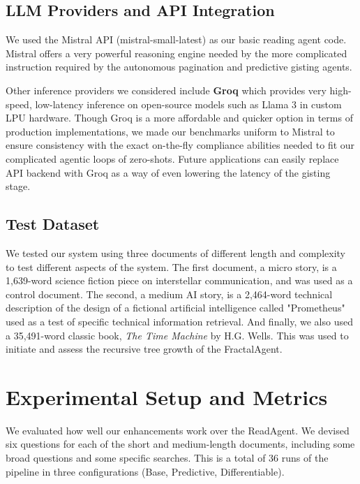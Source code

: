 \documentclass[conference]{IEEEtran}
\begin{document}
\subsection{LLM Providers and API Integration}
We used the Mistral API (mistral-small-latest) as our basic reading agent code. Mistral offers a very powerful reasoning engine needed by the more complicated instruction required by the autonomous pagination and predictive gisting agents. 

Other inference providers we considered include \textbf{Groq} which provides very high-speed, low-latency inference on open-source models such as Llama 3 in custom LPU hardware. Though Groq is a more affordable and quicker option in terms of production implementations, we made our benchmarks uniform to Mistral to ensure consistency with the exact on-the-fly compliance abilities needed to fit our complicated agentic loops of zero-shots. Future applications can easily replace API backend with Groq as a way of even lowering the latency of the gisting stage.

\subsection{Test Dataset}
We tested our system using three documents of different length and complexity to test different aspects of the system. The first document, a micro story, is a 1,639-word science fiction piece on interstellar communication, and was used as a control document. The second, a medium AI story, is a 2,464-word technical description of the design of a fictional artificial intelligence called "Prometheus" used as a test of specific technical information retrieval. And finally, we also used a 35,491-word classic book, \textit{The Time Machine} by H.G. Wells. This was used to initiate and assess the recursive tree growth of the FractalAgent.

\section{Experimental Setup and Metrics}
We evaluated how well our enhancements work over the ReadAgent. We devised six questions for each of the short and medium-length documents, including some broad questions and some specific searches. This is a total of 36 runs of the pipeline in three configurations (Base, Predictive, Differentiable). 
\end{document}
